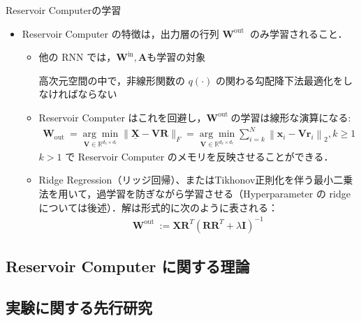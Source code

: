 \begin{frame}{Reservoir Computerの学習}
    \begin{itemize}
        \item Reservoir Computer の特徴は，出力層の行列 $\mathbf{W}^{\text {out }}$ のみ学習されること．\begin{itemize}
            \item 他の RNN では，$\mathbf{W}^{\text {in}}, \mathbf{A}$も学習の対象 
            
            \rightarrow 高次元空間の中で，非線形関数の $q(\cdot)$ の関わる勾配降下法最適化をしなければならない 
            
            \item Reservoir Computer はこれを回避し，$\mathbf{W}^{\text {out }}$の学習は線形な演算になる: 
            \begin{align}
                \mathbf{W}_{\text {out }}=\underset{\mathbf{V} \in \mathbb{R}^{d_x \times d_r}}{\arg \min }\|\underline{\mathbf{X}}-\mathbf{V R}\|_F=\underset{\mathbf{V} \in \mathbb{R}^{d_x \times d_r}}{\arg \min } \sum_{i=k}^N\left\|\mathbf{x}_i-\mathbf{V r}_i\right\|_2, k \geq 1 
            \end{align}
            $k > 1$ で Reservoir Computer のメモリを反映させることができる．
            \item Ridge Regression（リッジ回帰）、またはTikhonov正則化を伴う最小二乗法を用いて，過学習を防ぎながら学習させる（Hyperparameter の ridge については後述）．解は形式的に次のように表される：
            \begin{align}
                \mathbf{W}^{\text {out }}:=\mathbf{X R}^T\left(\mathbf{R R}^T+\lambda \mathbf{I}\right)^{-1}
            \end{align}
        \end{itemize}
    \end{itemize}
\end{frame}

\subsection{Reservoir Computer に関する理論}
\begin{frame}
    
\end{frame}

\subsection{実験に関する先行研究}



